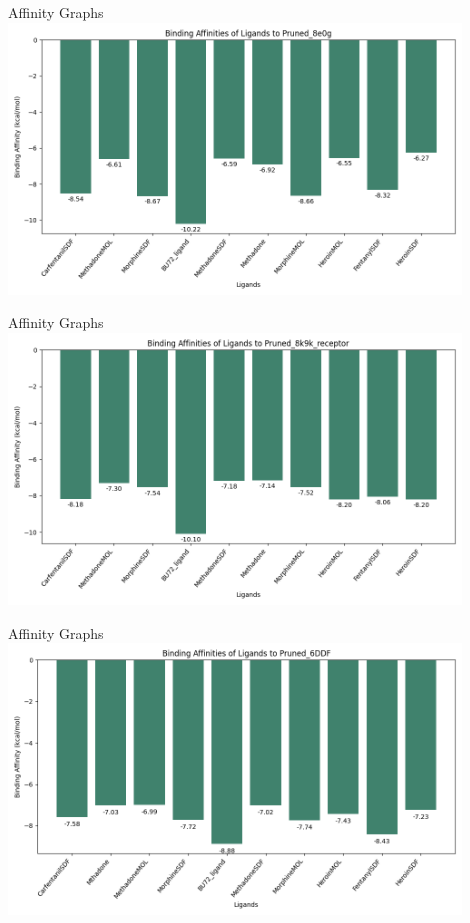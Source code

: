 \documentclass{beamer}
\begin{document}
\begin{frame}{Affinity Graphs}
\includegraphics[width=12cm]{img/Graphs/Pruned_8e0g_affinities.png}
\end{frame}
\begin{frame}{Affinity Graphs}
\includegraphics[width=12cm]{img/Graphs/Pruned_8k9k_receptor_affinities.png}
\end{frame}
\begin{frame}{Affinity Graphs}
\includegraphics[width=12cm]{img/Graphs/Pruned_6DDF_affinities.png}
\end{frame}
\end{document}
